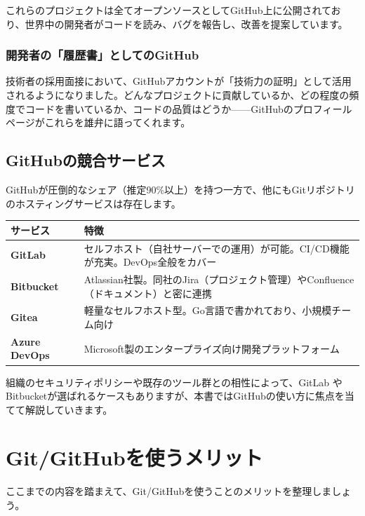 これらのプロジェクトは全てオープンソースとしてGitHub上に公開されており、世界中の開発者がコードを読み、バグを報告し、改善を提案しています。

\subsubsection{開発者の「履歴書」としてのGitHub}

技術者の採用面接において、GitHubアカウントが「技術力の証明」として活用されるようになりました。どんなプロジェクトに貢献しているか、どの程度の頻度でコードを書いているか、コードの品質はどうか——GitHubのプロフィールページがこれらを雄弁に語ってくれます。

\subsection{GitHubの競合サービス}

GitHubが圧倒的なシェア（推定90\%以上）を持つ一方で、他にもGitリポジトリのホスティングサービスは存在します。

\begin{table}[htbp]
\centering
\begin{tabular}{lp{10cm}}
\hline
\textbf{サービス} & \textbf{特徴} \\
\hline
\textbf{GitLab} & セルフホスト（自社サーバーでの運用）が可能。CI/CD機能が充実。DevOps全般をカバー \\
\textbf{Bitbucket} & Atlassian社製。同社のJira（プロジェクト管理）やConfluence（ドキュメント）と密に連携 \\
\textbf{Gitea} & 軽量なセルフホスト型。Go言語で書かれており、小規模チーム向け \\
\textbf{Azure DevOps} & Microsoft製のエンタープライズ向け開発プラットフォーム \\
\hline
\end{tabular}
\end{table}

組織のセキュリティポリシーや既存のツール群との相性によって、GitLab やBitbucketが選ばれるケースもありますが、本書ではGitHubの使い方に焦点を当てて解説していきます。

\section{Git/GitHubを使うメリット}

ここまでの内容を踏まえて、Git/GitHubを使うことのメリットを整理しましょう。

